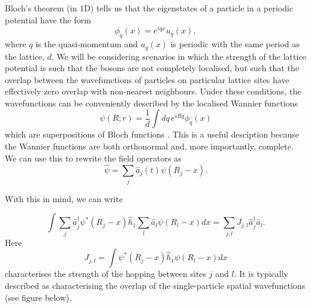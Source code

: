 \documentclass[a4paper,10pt]{article}
\begin{document}
Bloch's theorem (in 1D) \cite{Bloch1929,Kittel1987} tells us that the eigenstates of a particle in a periodic potential have the form
\begin{equation}
 \phi_q(x)=e^{iqx}u_{q}(x),
\end{equation}
where $q$ is the quasi-momentum and $u_q(x)$ is periodic with the same period as the lattice, $d$. We will be considering scenarios in which the strength of the lattice potential
is such that the bosons are not completely localised, but such that the overlap between the wavefunctions of particles on particular lattice sites have effectively zero overlap 
with non-nearest neighbours. Under these conditions, the wavefunctions can be conveniently described by the localised Wannier functions
\begin{equation}
\psi(R;r)=\frac{1}{d}\int dq\, e^{iRq}\phi_q(x)
\end{equation}
which are superpositions of Bloch functions \cite{Kittel1987,Wannier1937}. This is a useful desciption because the Wannier functions are both orthonormal and, more importantly, complete.
We can use this to rewrite the field operators as 
\begin{equation}
\label{field_operators_wannier}
 \hat{\psi}=\sum_j \hat{a}_{j}(t)\psi(R_j-x).
\end{equation}

With this in mind, we can write

\begin{equation}
 \int  \sum_j\hat{a}_j^{\dagger}\psi^{*}(R_j-x) \hat{h}_1  \sum_l  \hat{a}_l\psi(R_l-x)dx=\sum_{j,l} J_{j,l}\hat{a}_{j}^{\dagger}\hat{a}_l.
\end{equation}
Here
\begin{equation}
 J_{j,l}=\int  \psi^{*}(R_j-x) \hat{h}_1  \psi(R_l-x)dx
\end{equation}
characterises the strength of the hopping between sites $j$ and $l$. It is typically described  as characterising the overlap of the single-particle spatial wavefunctions (see figure below).
\end{document}
